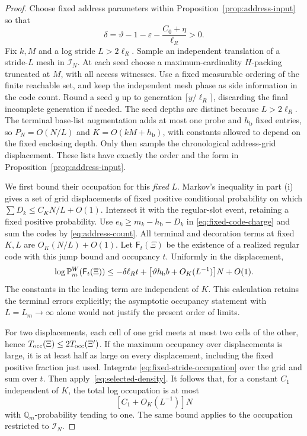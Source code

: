 \begin{proof}
Choose fixed address parameters within
Proposition~\ref{prop:address-input} so that
\[
 \delta=\vartheta-1-\varepsilon-\frac{C_0+\eta}{\ell_R}>0.
\]
Fix \(k,M\) and a log stride \(L>2\ell_R\).  Sample an independent
translation of a stride-\(L\) mesh in \(\mathcal I_N\).  At each
seed choose a maximum-cardinality \(H\)-packing truncated at \(M\), with all
access witnesses.
Use a fixed measurable ordering of the finite reachable set, and
keep the independent mesh phase as side information in the code count.
Round a seed \(y\) up to generation \(\lceil y/\ell_R\rceil\),
discarding the final incomplete generation if needed.  The seed
depths are distinct because \(L>2\ell_R\).  The terminal base-list
augmentation adds at most one probe and \(h_{\mathrm b}\) fixed
entries, so \(P_N=O(N/L)\) and \(K=O(kM+h_{\mathrm b})\), with
constants allowed to depend on the fixed enclosing depth.
Only then sample the chronological address-grid displacement.
These lists have exactly the order and the form in
Proposition~\ref{prop:address-input}.

We first bound their occupation for this \emph{fixed} \(L\).
Markov's inequality in part (i) gives a set of grid displacements
of fixed positive conditional probability on which
\(\sum D_k\le C_KN/L+O(1)\).  Intersect it with the regular-slot
event, retaining a fixed positive probability.  Use
\(e_k\ge m_k-h_{\mathrm b}-D_k\) in
\eqref{eq:fixed-code-charge} and sum the codes by
\eqref{eq:address-count}.
All terminal and decoration terms at fixed \(K,L\) are
\(O_K(N/L)+O(1)\).  Let \(\mathsf F_t(\Xi)\) be the existence
of a realized regular code with this jump bound and occupancy \(t\).
Uniformly in the displacement,
\begin{equation}
\label{eq:fixed-stride-occupation}
 \log\mathbb P_m^W(\mathsf F_t(\Xi))
 \le -\delta\ell_Rt+
       \bigl[\vartheta h_{\mathrm b}b+O_K(L^{-1})\bigr]N+O(1).
\end{equation}
The constants in the leading term are independent of \(K\).
This calculation retains the terminal errors explicitly; the
asymptotic occupancy statement with \(L=L_m\to\infty\) alone would
not justify the present order of limits.

For two displacements, each cell of one grid meets at most two
cells of the other, hence \(T_{\rm occ}(\Xi)\le
2T_{\rm occ}(\Xi')\).  If the maximum occupancy over displacements
is large, it is at least half as large on every displacement,
including the fixed positive fraction just used.  Integrate
\eqref{eq:fixed-stride-occupation} over the grid and sum over \(t\).
Then apply~\eqref{eq:selected-density}.  It follows that, for a
constant \(C_1\) independent of \(K\), the total log occupation
is at most
\[
 [C_1+O_K(L^{-1})]N
\]
with \(\mathbb Q_m\)-probability tending to one.  The same bound
applies to the occupation restricted to \(\mathcal I_N\).


\end{proof}
